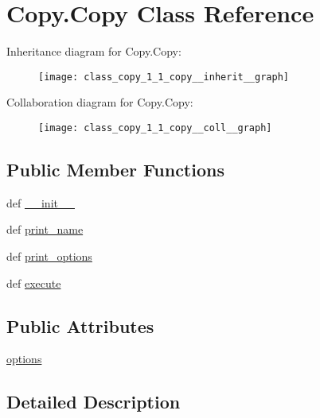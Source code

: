 \hypertarget{class_copy_1_1_copy}{\section{Copy.\-Copy Class Reference}
\label{class_copy_1_1_copy}
}


Inheritance diagram for Copy.\-Copy\-:
\nopagebreak
\begin{figure}[H]
\begin{center}
\leavevmode
\texttt{[image: class\_copy\_1\_1\_copy\_\_inherit\_\_graph]}
\end{center}
\end{figure}


Collaboration diagram for Copy.\-Copy\-:
\nopagebreak
\begin{figure}[H]
\begin{center}
\leavevmode
\texttt{[image: class\_copy\_1\_1\_copy\_\_coll\_\_graph]}
\end{center}
\end{figure}
\subsection*{Public Member Functions}
\begin{DoxyCompactItemize}
\item 
def \hyperlink{class_copy_1_1_copy_ab4ab01df1326525fc1954500089f8cd4}{\-\_\-\-\_\-init\-\_\-\-\_\-}
\item 
def \hyperlink{class_copy_1_1_copy_a17b5b7fedb1e45364abd52400c502e58}{print\-\_\-name}
\item 
def \hyperlink{class_copy_1_1_copy_a4a189542d9e0537e4345ec3e02a5a16c}{print\-\_\-options}
\item 
def \hyperlink{class_copy_1_1_copy_a3822ae662ccd3a455bb673c975f48e97}{execute}
\end{DoxyCompactItemize}
\subsection*{Public Attributes}
\begin{DoxyCompactItemize}
\item 
\hyperlink{class_copy_1_1_copy_ac6c7d7a32af88b3a7068f937e29a9297}{options}
\end{DoxyCompactItemize}


\subsection{Detailed Description}


